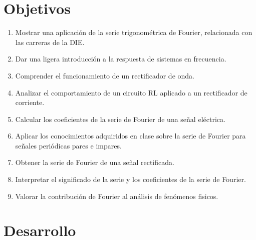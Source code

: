 \documentclass[a4paper,12pt]{article}
\begin{document}
\section{Objetivos}
\begin{enumerate}
    \item Mostrar una aplicación de la serie trigonométrica de Fourier, relacionada con las carreras de la DIE.
    \item Dar una ligera introducción a la respuesta de sistemas en frecuencia.
    \item Comprender el funcionamiento de un rectificador de onda.
    \item Analizar el comportamiento de un circuito RL aplicado a un rectificador de corriente.
    \item Calcular los coeficientes de la serie de Fourier de una señal eléctrica.
    \item Aplicar los conocimientos adquiridos en clase sobre la serie de Fourier para señales periódicas pares e impares.
    \item Obtener la serie de Fourier de una señal rectificada.
    \item Interpretar el significado de la serie y los coeficientes de la serie de Fourier.
    \item Valorar la contribución de Fourier al análisis de fenómenos fisicos.    
\end{enumerate}

\section{Desarrollo}
\end{document}
